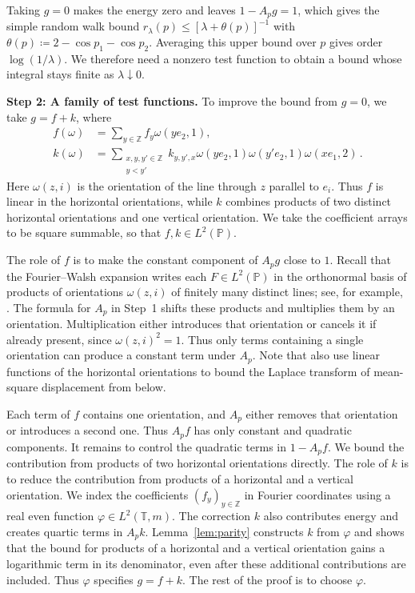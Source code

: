 \documentclass[11pt]{amsart}
\theoremstyle{plain}
\theoremstyle{definition}
\newcommand{\Z}{\mathbb Z}
\newcommand{\T}{\mathbb T}
\renewcommand{\P}{\mathbb P}
\newcommand{\1}{\mathbf 1}
\begin{document}
	Taking $g=0$ makes the energy zero and leaves $1-A_pg=1$, which
	gives the simple random walk bound $r_\lambda(p)\leq[\lambda+\theta(p)]^{-1}$
	with $\theta(p)\coloneqq2-\cos p_1-\cos p_2$.  Averaging this upper bound
	over $p$ gives order $\log(1/\lambda)$.  We therefore need a nonzero test function to
	obtain a bound whose integral stays finite as $\lambda\downarrow0$. 
	
	\medskip
	\noindent\textbf{Step 2: A family of test functions.}
	To improve the bound from $g=0$, we take $g=f+k$, where
	\begin{equation}\label{eq:overview-test-family}
	  \begin{split}
	    f(\omega)&=\sum_{y\in\Z}f_y\omega(ye_2,1),\\
	    k(\omega)&=\sum_{\substack{x,y,y'\in\Z\\y<y'}}
	      k_{y,y',x}\omega(ye_2,1)\omega(y'e_2,1)\omega(xe_1,2)\, .
	  \end{split}
	\end{equation}
	Here $\omega(z,i)$ is the orientation of the line through $z$ parallel
	to $e_i$.  Thus $f$ is linear in the horizontal orientations, while $k$
	combines products of two distinct horizontal orientations and one vertical
	orientation.  We take the coefficient arrays to be square summable, so
	that $f,k\in L^2(\P)$.
	
	The role of $f$ is to make the constant component of $A_pg$
	close to $1$.  Recall that the Fourier--Walsh expansion writes each
	$F\in L^2(\P)$ in the
	orthonormal basis of products of orientations $\omega(z,i)$ of finitely
	many distinct lines; see, for example, \citet*[Theorem~1.5]{ODo14}.
	The formula for $A_p$ in Step~1 shifts these products and multiplies
	them by an orientation.  Multiplication either introduces that
	orientation or cancels it if already present, since $\omega(z,i)^2=1$.
	Thus only terms containing a single orientation can produce a
	constant term under $A_p$.  Note that \citet*[(2.1)]{LTV18} also use linear functions of the horizontal
	orientations to bound the Laplace transform of mean-square displacement
	from below.
	
	Each term of $f$ contains one orientation, and $A_p$ either removes
	that orientation or introduces a second one.  Thus $A_pf$ has only
	constant and quadratic components.  It remains to control the quadratic
	terms in $1-A_pf$.  We bound the
	contribution from products of two horizontal orientations directly.
	The role of $k$ is to reduce the contribution from products of a horizontal and a vertical
	orientation. We index the coefficients $(f_y)_{y\in\Z}$
	in Fourier coordinates using a real even function $\varphi\in L^2(\T,m)$.
	The correction $k$ also contributes energy and creates quartic terms
	in $A_pk$.  Lemma~\ref{lem:parity} constructs $k$ from $\varphi$ and
	shows that the bound for products of a horizontal and a vertical
	orientation gains a logarithmic term in its denominator, even after
	these additional contributions are included.  Thus $\varphi$ specifies $g=f+k$. The rest of the proof is to choose $\varphi$. 
	
\end{document}
